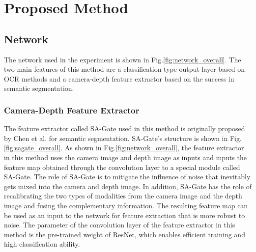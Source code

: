 \section{Proposed Method}

\subsection{Network}
The network used in the experiment is shown in Fig.\ref{fig:network_overall}.
The two main features of this method are a classification type output layer based on OCR methods and a camera-depth feature extractor based on the success in semantic segmentation.


\subsubsection{Camera-Depth Feature Extractor}
The feature extractor called SA-Gate used in this method\cite{SAGATE} is originally proposed by Chen et al. for semantic segmentation. SA-Gate's structure is shown in Fig.\ref{fig:sagate_overall}. As shown in Fig.\ref{fig:network_overall}, the feature extractor in this method uses the camera image and depth image as inputs and inputs the feature map obtained through the convolution layer to a special module called SA-Gate. The role of SA-Gate is to mitigate the influence of noise that inevitably gets mixed into the camera and depth image. In addition, SA-Gate has the role of recalibrating the two types of modalities from the camera image and the depth image and fusing the complementary information. The resulting feature map can be used as an input to the network for feature extraction that is more robust to noise. The parameter of the convolution layer of the feature extractor in this method is the pre-trained weight of ResNet\cite{he2015deep}, which enables efficient training and high classification ability.


